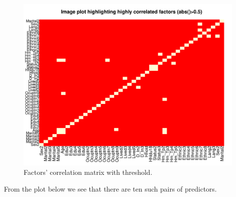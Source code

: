\documentclass[11pt]{article}
\begin{document}
\begin{figure}[h!]
  \caption{Factors' correlation matrix with threshold.}
  \centering
    \includegraphics[width=1.0\textwidth]{FutureResearch/CorrImageWithThresh.pdf}
\end{figure}

From the plot below we see that there are ten such pairs of predictors.
\end{document}
